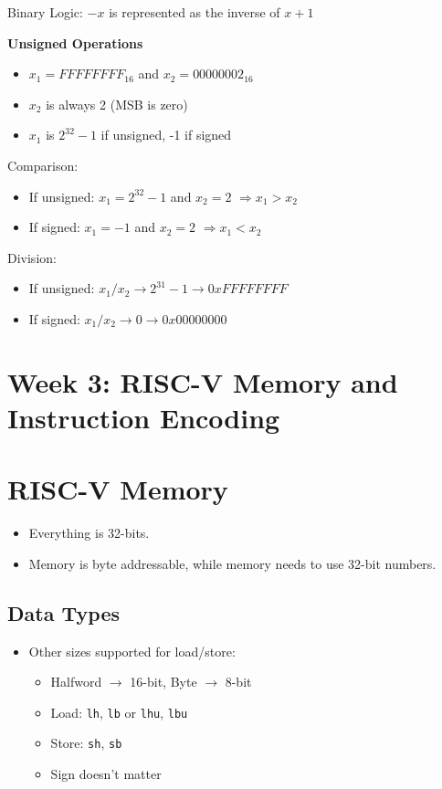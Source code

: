 \documentclass{article}
\begin{document}
Binary Logic: $-x$ is represented as the inverse of $x + 1$

\textbf{Unsigned Operations}
\begin{itemize}
    \item $x_1 = FFFFFFFF_{16}$ and $x_2 = 00000002_{16}$
    \item $x_2$ is always 2 (MSB is zero)
    \item $x_1$ is $2^{32}-1$ if unsigned, -1 if signed
\end{itemize}

Comparison:
\begin{itemize}
    \item If unsigned: $x_1 = 2^{32}-1$ and $x_2 = 2$ $\Rightarrow x_1 > x_2$
    \item If signed: $x_1 = -1$ and $x_2 = 2$ $\Rightarrow x_1 < x_2$
\end{itemize}

Division:
\begin{itemize}
    \item If unsigned: $x_1/x_2 \rightarrow 2^{31}-1 \rightarrow 0xFFFFFFFF$
    \item If signed: $x_1/x_2 \rightarrow 0 \rightarrow 0x00000000$
\end{itemize}


\newpage
\section*{Week 3: RISC-V Memory and Instruction Encoding}

\section*{RISC-V Memory}
\begin{itemize}
    \item Everything is 32-bits.
    \item Memory is byte addressable, while memory needs to use 32-bit numbers.
\end{itemize}

\subsection*{Data Types}
\begin{itemize}
    \item Other sizes supported for load/store:
    \begin{itemize}
        \item Halfword $\rightarrow$ 16-bit, Byte $\rightarrow$ 8-bit
        \item Load: \texttt{lh}, \texttt{lb} or \texttt{lhu}, \texttt{lbu}
        \item Store: \texttt{sh}, \texttt{sb}
        \item Sign doesn’t matter
    \end{itemize}
\end{itemize}
\end{document}
